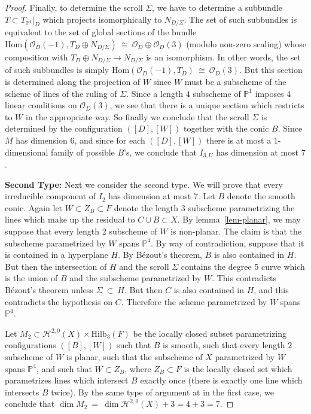 \documentclass[twoside,12pt,reqno]{amsart}
\theoremstyle{plain}
\theoremstyle{definition}
\newcommand{\Hdg}[2]{\mathcal{H}^{#1,#2}}
\newcommand{\PP}{\mathbb{P}}
\newcommand{\HI}[2]{\text{Hilb}_{#1}(#2)}
\def\ps{\vspace{4pt}}
\newcommand{\OO}{\mathcal O}
\begin{document}
\begin{proof}
\ps

Finally, to determine the scroll $\Sigma$, we have to determine a
subbundle $T\subset T_{\PP^4}|_D$ which projects isomorphically to
$N_{D/\Sigma}$.  The set of such subbundles is equivalent to the set
of global sections of the bundle $\text{Hom}(\OO_D(-1),T_D\oplus
N_{D/\Sigma})~\cong~ \OO_D\oplus \OO_D(3)$ (modulo non-zero scaling)
whose composition with $T_D\oplus N_{D/\Sigma}\rightarrow
N_{D/\Sigma}$ is an isomorphism.  In other words, the set of such
subbundles is simply $\text{Hom}(\OO_D(-1),T_D)~\cong~\OO_D(3)$.  
But this section is determined along the projection of $W$ since $W$
must be a subscheme of the scheme of lines of the ruling of $\Sigma$.
Since a length $4$ subscheme of $\PP^1$ imposes 4 linear conditions on 
$\OO_D(3)$, we see that there is a unique section which restricts to
$W$ in the appropriate way.  So finally we conclude that the scroll
$\Sigma$ is determined by the configuration $([D],[W])$ together with
the conic $B$.  Since $M$ has dimension 6, and since for each
$([D],[W])$ there is at most a 1-dimensional family of possible $B$'s, 
we conclude that $I_{3,U}$ has dimension at most $7$.  

\ps

\textbf{Second Type:}
Next we consider the second type.  We will prove that every
irreducible component of $I_2$ has dimension at most 7.
Let $B$ denote the smooth conic.
Again let $W\subset Z_B\subset F$ denote the length $3$ subscheme
parametrizing the lines which make up the residual to $C\cup B\subset
X$.  By lemma~\ref{lem-planar}, we may suppose that every length
2 subscheme of $W$ is non-planar.  The claim is that the subscheme
parametrized by $W$ spans $\PP^4$.  By way of contradiction, suppose
that it is contained in a hyperplane $H$.  By B\'ezout's theorem, $B$
is also contained in $H$.  But then the intersection of $H$ and the
scroll $\Sigma$ contains the degree 5 curve which is the union of $B$
and the subscheme parametrized by $W$.  This contradicts B\'ezout's
theorem unless $\Sigma~\subset~H$.  But then $C$ is also contained in
$H$, and this contradicts the hypothesis on $C$.  Therefore the scheme 
parametrized by $W$ spans $\PP^4$.  

\ps

Let $M_2\subset \Hdg{2}{0}(X)\times \HI{3}{F}$ be the locally closed subset
parametrizing configurations $([B],[W])$ such that $B$ is smooth, such 
that every length 2 subscheme of $W$ is planar, such that the
subscheme of $X$ parametrized by $W$ spans $\PP^4$, and such that
$W\subset Z_B$, where $Z_B\subset F$ is the locally closed set which
parametrizes lines which intersect $B$ exactly once (there is exactly
one line which intersects $B$ twice).  By the same type of argument at 
in the first case, we conclude that $\dim  M_2 ~=~ \dim 
\Hdg{2}{0}(X) + 3 = 4+3 = 7$.


\end{proof}
\end{document}
